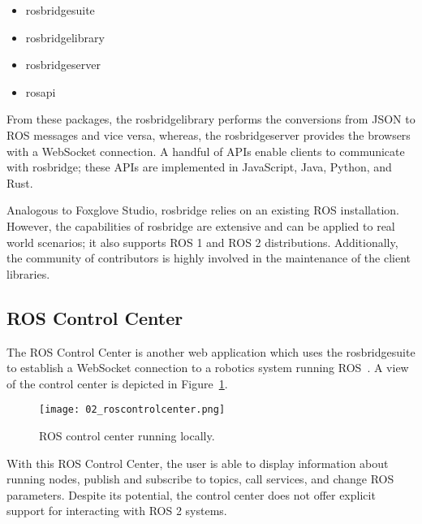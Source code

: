         \begin{itemize}
            \item \textsf{rosbridge\smallunderscore  suite}
            \item \textsf{rosbridge\smallunderscore  library}
            \item \textsf{rosbridge\smallunderscore  server}
            \item \textsf{rosapi}
        \end{itemize}

        From these packages, the \textsf{rosbridge\smallunderscore  library} performs the conversions from \ac{JSON} to \ac{ROS} messages and vice versa, whereas, the \textsf{rosbridge\smallunderscore  server} provides the browsers with a WebSocket connection. A handful of \ac{API}s enable clients to communicate with \textsf{rosbridge}; these \ac{API}s are implemented in JavaScript, Java, Python, and Rust.

        Analogous to Foxglove Studio, \textsf{rosbridge} relies on an existing ROS installation. However, the capabilities of \textsf{rosbridge} are extensive and can be applied to real world scenarios; it also supports \ac{ROS} 1 and \ac{ROS} 2 distributions. Additionally, the community of contributors is highly involved in the maintenance of the client libraries.

    \subsection{ROS Control Center}\label{sec:roscontrolcenter}

        The \ac{ROS} Control Center is another web application which uses the \textsf{rosbridge\smallunderscore  suite} to establish a WebSocket connection to a robotics system running \ac{ROS}~\cite{controlcenter}. A view of the control center is depicted in Figure~\ref{fig:roscontrolcenter}.

        \begin{figure}[htbp]
            \centering
            \texttt{[image: 02\_roscontrolcenter.png]}
            \caption{ROS control center running locally.}
            \label{fig:roscontrolcenter}
        \end{figure}

        With this \ac{ROS} Control Center, the user is able to display information about running nodes, publish and subscribe to topics, call services, and change \ac{ROS} parameters. Despite its potential, the control center does not offer explicit support for interacting with \ac{ROS} 2 systems.


